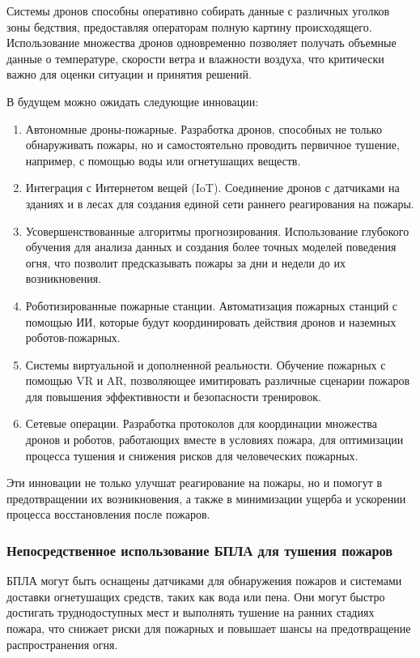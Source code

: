 Системы дронов способны оперативно собирать данные с различных уголков зоны бедствия, предоставляя операторам полную картину происходящего. Использование множества дронов одновременно позволяет получать объемные данные о температуре, скорости ветра и влажности воздуха, что критически важно для оценки ситуации и принятия решений.

В будущем можно ожидать следующие инновации:
\begin{enumerate}
	\item Автономные дроны-пожарные. Разработка дронов, способных не только обнаруживать пожары, но и самостоятельно проводить первичное тушение, например, с помощью воды или огнетушащих веществ.
	\item Интеграция с Интернетом вещей (IoT). Соединение дронов с датчиками на зданиях и в лесах для создания единой сети раннего реагирования на пожары.
	\item Усовершенствованные алгоритмы прогнозирования. Использование глубокого обучения для анализа данных и создания более точных моделей поведения огня, что позволит предсказывать пожары за дни и недели до их возникновения.
	\item Роботизированные пожарные станции. Автоматизация пожарных станций с помощью ИИ, которые будут координировать действия дронов и наземных роботов-пожарных.
	\item Системы виртуальной и дополненной реальности. Обучение пожарных с помощью VR и AR, позволяющее имитировать различные сценарии пожаров для повышения эффективности и безопасности тренировок.
	\item Сетевые операции. Разработка протоколов для координации множества дронов и роботов, работающих вместе в условиях пожара, для оптимизации процесса тушения и снижения рисков для человеческих пожарных.
\end{enumerate}

Эти инновации не только улучшат реагирование на пожары, но и помогут в предотвращении их возникновения, а также в минимизации ущерба и ускорении процесса восстановления после пожаров.
\subsubsection{Непосредственное использование БПЛА для тушения пожаров}

БПЛА могут быть оснащены датчиками для обнаружения пожаров и системами доставки огнетушащих средств, таких как вода или пена. Они могут быстро достигать труднодоступных мест и выполнять тушение на ранних стадиях пожара, что снижает риски для пожарных и повышает шансы на предотвращение распространения огня.

